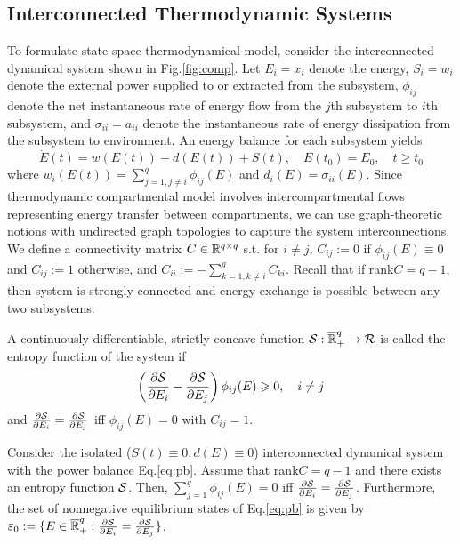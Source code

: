 \documentclass{paper}
\begin{document}
\subsection{Interconnected Thermodynamic Systems}
To formulate state space thermodynamical model, consider the interconnected dynamical system shown in Fig.\ref{fig:comp}.
Let $E_i=x_i$ denote the energy, $S_i=w_i$ denote the external power supplied to or extracted from the subsystem, $\phi_{ij}$
denote the net instantaneous rate of energy flow from the $j$th subsystem to $i$th subsystem, and $\sigma_{ii}=a_{ii}$ denote 
the instantaneous rate of energy dissipation from the subsystem to environment. An energy balance for each subsystem yields
\begin{equation}\label{eq:pb}
\dot{E}(t)=w(E(t))-d(E(t))+S(t),\quad E(t_0)=E_0,\quad t\geqslant t_0
\end{equation}
where $w_i(E(t))=\sum_{j=1,j\neq i}^{q}\phi_{ij}(E)$ and $d_i(E)=\sigma_{ii}(E)$. 
Since thermodynamic compartmental model involves intercompartmental flows representing energy transfer between compartments, 
we can use graph-theoretic notions with undirected graph topologies to capture the system interconnections. We define a
connectivity matrix $C\in\mathbb{R}^{q\times q}$ s.t. for $i\neq j$, $C_{ij}:=0$ if $\phi_{ij}(E)\equiv 0$ and $C_{ij}:=1$ otherwise,
and $C_{ii}:=-\sum_{k=1,k\neq i}^{q}C_{ki}$. Recall that if rank$C=q-1$, then system is strongly connected and energy exchange
is possible between any two subsystems.
\begin{defi}\label{def:entropy}
A continuously differentiable, strictly concave function $\mathcal{S}:\overline{\mathbb{R}}_{+}^{q}\rightarrow \mathcal{R}$ is 
called the entropy function of the system if
\begin{equation}\label{eq:t2}
\left(\frac{\partial \mathcal{S}}{\partial E_i}-\frac{\partial \mathcal{S}}{\partial E_j}\right)\phi_{ij}(E)\geqslant 0, \quad i\neq j
\end{equation}
and $\frac{\partial \mathcal{S}}{\partial E_i}=\frac{\partial \mathcal{S}}{\partial E_j}$ iff $\phi_{ij}(E)=0$ with $C_{ij}=1$.
\end{defi}
\begin{prop}
Consider the isolated ($S(t)\equiv 0, d(E)\equiv 0$) interconnected dynamical system with the power balance Eq.\ref{eq:pb}.
Assume that rank$C=q-1$ and there exists an entropy function $\mathcal{S}$. Then, $\sum_{j=1}^{q}\phi_{ij}(E)=0$ iff $
\frac{\partial \mathcal{S}}{\partial E_i}=\frac{\partial \mathcal{S}}{\partial E_j}$. Furthermore, the set of nonnegative equilibrium states of
Eq.\ref{eq:pb} is given by $\varepsilon_0:=\{E\in\overline{\mathbb{R}}_{+}^{q}: \frac{\partial \mathcal{S}}{\partial E_i}=
\frac{\partial \mathcal{S}}{\partial E_j}\}$.
\end{prop}
\end{document}
